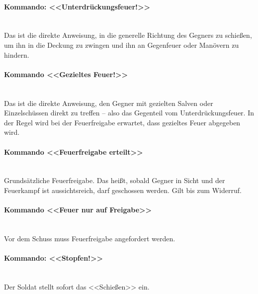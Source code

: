 \paragraph*{Kommando: <<Unterdrückungsfeuer!>>}\ \\
	Das ist die direkte Anweisung, in die generelle Richtung des Gegners zu schießen, um ihn in die Deckung zu zwingen und ihn an Gegenfeuer oder Manövern zu hindern.

\paragraph*{Kommando <<Gezieltes Feuer!>>}\ \\
	Das ist die direkte Anweisung, den Gegner mit gezielten Salven oder Einzelschüssen direkt zu treffen -- also das Gegenteil vom Unterdrückungsfeuer. In der Regel wird bei der Feuerfreigabe erwartet, dass gezieltes Feuer abgegeben wird.

\paragraph*{Kommando <<Feuerfreigabe erteilt>>}\ \\
	Grundsätzliche Feuerfreigabe. Das heißt, sobald Gegner in Sicht und der Feuerkampf ist aussichtsreich, darf geschossen werden. Gilt bis zum Widerruf.

\paragraph*{Kommando <<Feuer nur auf Freigabe>>}\ \\
	Vor dem Schuss muss Feuerfreigabe angefordert werden.

\paragraph*{Kommando: <<Stopfen!>>}\ \\
	Der Soldat stellt sofort das <<Schießen>> ein.

